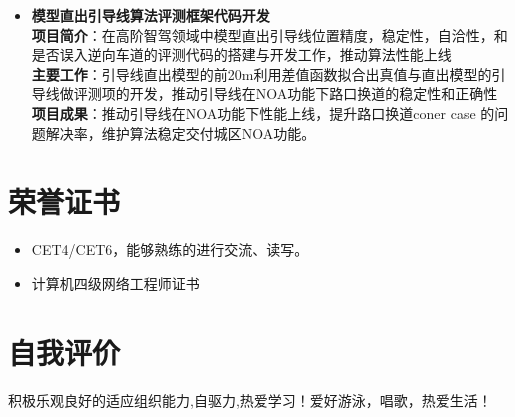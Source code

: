 \documentclass[11pt,a4paper]{article}
\begin{document}
\begin{itemize}[leftmargin=*]
    \item \textbf{模型直出引导线算法评测框架代码开发} \\
    \textbf{项目简介}：在高阶智驾领域中模型直出引导线位置精度，稳定性，自洽性，和是否误入逆向车道的评测代码的搭建与开发工作，推动算法性能上线 \\
    \textbf{主要工作}：引导线直出模型的前20m利用差值函数拟合出真值与直出模型的引导线做评测项的开发，推动引导线在NOA功能下路口换道的稳定性和正确性 \\
    \textbf{项目成果}：推动引导线在NOA功能下性能上线，提升路口换道coner case 的问题解决率，维护算法稳定交付城区NOA功能。

\end{itemize}

\section*{荣誉证书}
\begin{itemize}[leftmargin=*]
    \item CET4/CET6，能够熟练的进行交流、读写。
    \item 计算机四级网络工程师证书
\end{itemize}

\section*{自我评价}
积极乐观良好的适应组织能力,自驱力,热爱学习！爱好游泳，唱歌，热爱生活！
\end{document}

